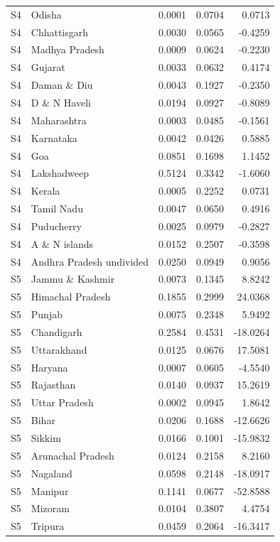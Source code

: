 \documentclass[11pt,a4paper]{report}
\begin{document}
\begin{longtable}{l>{\raggedright\arraybackslash}p{5cm}rrr}
S4 & Odisha & 0.0001 & 0.0704 & 0.0713 \\
S4 & Chhattisgarh & 0.0030 & 0.0565 & -0.4259 \\
S4 & Madhya Pradesh & 0.0009 & 0.0624 & -0.2230 \\
S4 & Gujarat & 0.0033 & 0.0632 & 0.4174 \\
S4 & Daman \& Diu & 0.0043 & 0.1927 & -0.2350 \\
S4 & D \& N Haveli & 0.0194 & 0.0927 & -0.8089 \\
S4 & Maharashtra & 0.0003 & 0.0485 & -0.1561 \\
S4 & Karnataka & 0.0042 & 0.0426 & 0.5885 \\
S4 & Goa & 0.0851 & 0.1698 & 1.1452 \\
S4 & Lakshadweep & 0.5124 & 0.3342 & -1.6060 \\
S4 & Kerala & 0.0005 & 0.2252 & 0.0731 \\
S4 & Tamil Nadu & 0.0047 & 0.0650 & 0.4916 \\
S4 & Puducherry & 0.0025 & 0.0979 & -0.2827 \\
S4 & A \& N islands & 0.0152 & 0.2507 & -0.3598 \\
S4 & Andhra Pradesh undivided & 0.0250 & 0.0949 & 0.9056 \\
S5 & Jammu \& Kashmir & 0.0073 & 0.1345 & 8.8242 \\
S5 & Himachal Pradesh & 0.1855 & 0.2999 & 24.0368 \\
S5 & Punjab & 0.0075 & 0.2348 & 5.9492 \\
S5 & Chandigarh & 0.2584 & 0.4531 & -18.0264 \\
S5 & Uttarakhand & 0.0125 & 0.0676 & 17.5081 \\
S5 & Haryana & 0.0007 & 0.0605 & -4.5540 \\
S5 & Rajasthan & 0.0140 & 0.0937 & 15.2619 \\
S5 & Uttar Pradesh & 0.0002 & 0.0945 & 1.8642 \\
S5 & Bihar & 0.0206 & 0.1688 & -12.6626 \\
S5 & Sikkim & 0.0166 & 0.1001 & -15.9832 \\
S5 & Arunachal Pradesh & 0.0124 & 0.2158 & 8.2160 \\
S5 & Nagaland & 0.0598 & 0.2148 & -18.0917 \\
S5 & Manipur & 0.1141 & 0.0677 & -52.8588 \\
S5 & Mizoram & 0.0104 & 0.3807 & 4.4754 \\
S5 & Tripura & 0.0459 & 0.2064 & -16.3417 \\

\end{longtable}
\end{document}
